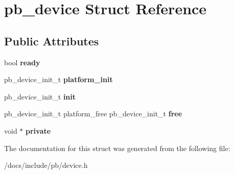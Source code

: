 \hypertarget{structpb__device}{}\section{pb\+\_\+device Struct Reference}
\label{structpb__device}
\subsection*{Public Attributes}
\begin{DoxyCompactItemize}
\item 
\mbox{\label{structpb__device_a6b4bb1e69d172bdc5b69678dd7e64b58}} 
bool {\bfseries ready}
\item 
\mbox{\label{structpb__device_aa55592d7a291a1d106b90f898cfe294d}} 
pb\+\_\+device\+\_\+init\+\_\+t {\bfseries platform\+\_\+init}
\item 
\mbox{\label{structpb__device_a5025519bd9e6c6f595a13416543658e9}} 
pb\+\_\+device\+\_\+init\+\_\+t {\bfseries init}
\item 
\mbox{\label{structpb__device_a0bcf4c345cda2f12b4bba1466b0668c3}} 
pb\+\_\+device\+\_\+init\+\_\+t platform\+\_\+free pb\+\_\+device\+\_\+init\+\_\+t {\bfseries free}
\item 
\mbox{\label{structpb__device_a5b80356b4e8c9afa14d360769b53db86}} 
void $\ast$ {\bfseries private}
\end{DoxyCompactItemize}


The documentation for this struct was generated from the following file\+:\begin{DoxyCompactItemize}
\item 
/docs/include/pb/device.\+h\end{DoxyCompactItemize}
